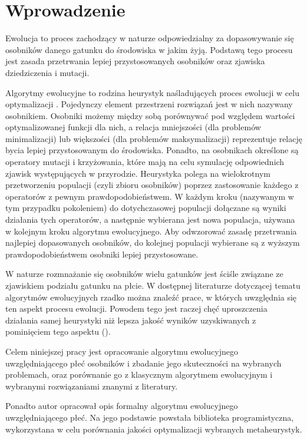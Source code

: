 \documentclass[./FM_mgr.tex]{subfiles}
\begin{document}
\chapter*{Wprowadzenie}
Ewolucja to proces zachodzący w naturze odpowiedzialny za dopasowywanie się osobników danego gatunku do środowiska w jakim żyją. 
Podstawą tego procesu jest zasada przetrwania lepiej przystosowanych osobników oraz zjawiska dziedziczenia i mutacji.

Algorytmy ewolucyjne to rodzina heurystyk naśladujących proces ewolucji w celu optymalizacji \cite{davis1991handbook}. 
Pojedynczy element przestrzeni rozwiązań jest w nich nazywany osobnikiem. 
Osobniki możemy między sobą porównywać pod względem wartości optymalizowanej funkcji dla nich, a relacja mniejszości (dla problemów minimalizacji) lub większości (dla problemów maksymalizacji) reprezentuje relację bycia lepiej przystosowanym do środowiska. 
Ponadto, na osobnikach określone są operatory mutacji i krzyżowania, które mają na celu symulację odpowiednich zjawisk występujących w przyrodzie. 
Heurystyka polega na wielokrotnym przetworzeniu populacji (czyli zbioru osobników) poprzez zastosowanie każdego z operatorów z pewnym prawdopodobieństwem. 
W każdym kroku (nazywanym w tym przypadku pokoleniem) do dotychczasowej populacji dołączane są wyniki działania tych operatorów, a następnie wybierana jest nowa populacja, używana w kolejnym kroku algorytmu ewolucyjnego. 
Aby odwzorować zasadę przetrwania najlepiej dopasowanych osobników, do kolejnej populacji wybierane są z wyższym prawdopodobieństwem osobniki lepiej przystosowane.

W naturze rozmnażanie się osobników wielu gatunków jest ściśle związane ze zjawiskiem podziału gatunku na płcie. 
W dostępnej literaturze dotyczącej tematu algorytmów ewolucyjnych rzadko można znaleźć prace, w których uwzględnia się ten aspekt procesu ewolucji. 
Powodem tego jest raczej chęć uproszczenia działania samej heurystyki niż lepsza jakość wyników uzyskiwanych z pominięciem tego aspektu (\cite{GGA, SexualGA}). 

Celem niniejszej pracy jest opracowanie algorytmu ewolucyjnego uwzględniającego płeć osobników i zbadanie jego skuteczności na wybranych problemach, oraz porównanie go z klasycznym algorytmem ewolucyjnym i wybranymi rozwiązaniami znanymi z literatury.

Ponadto autor opracował opis formalny algorytmu ewolucyjnego uwzględniającego płeć.
Na jego podstawie powstała biblioteka programistyczna, wykorzystana w celu porównania jakości optymalizacji wybranych metaheurystyk.
\end{document}
